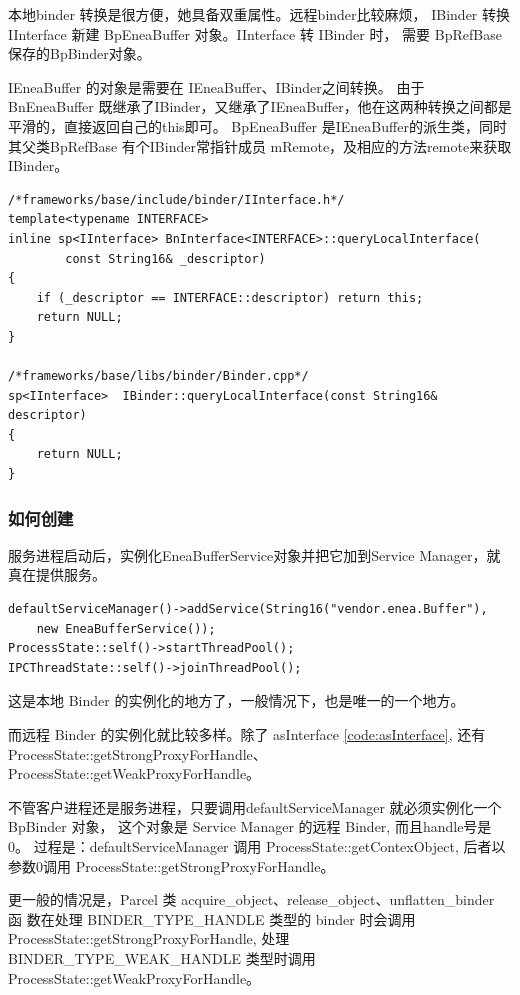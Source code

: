 \documentclass[a4paper,11pt]{article}
\begin{document}
本地binder 转换是很方便，她具备双重属性。远程binder比较麻烦，  IBinder 转换
IInterface 新建 BpEneaBuffer 对象。IInterface 转 IBinder 时， 需要 BpRefBase
保存的BpBinder对象。

IEneaBuffer 的对象是需要在 IEneaBuffer、IBinder之间转换。
由于 BnEneaBuffer 既继承了IBinder，又继承了IEneaBuffer，他在这两种转换之间都是平滑的，直接返回自己的this即可。
 BpEneaBuffer 是IEneaBuffer的派生类，同时其父类BpRefBase 有个IBinder常指针成员 mRemote，及相应的方法remote来获取IBinder。

\begin{lstlisting}[]
/*frameworks/base/include/binder/IInterface.h*/
template<typename INTERFACE>
inline sp<IInterface> BnInterface<INTERFACE>::queryLocalInterface(
        const String16& _descriptor)
{
    if (_descriptor == INTERFACE::descriptor) return this;
    return NULL;
}    

/*frameworks/base/libs/binder/Binder.cpp*/
sp<IInterface>  IBinder::queryLocalInterface(const String16& descriptor)
{
    return NULL;
} 
\end{lstlisting}

\subsubsection{如何创建}
服务进程启动后，实例化EneaBufferService对象并把它加到Service Manager，就真在提供服务。 
\begin{lstlisting}
defaultServiceManager()->addService(String16("vendor.enea.Buffer"),
    new EneaBufferService());
ProcessState::self()->startThreadPool();
IPCThreadState::self()->joinThreadPool();
\end{lstlisting}
这是本地 Binder 的实例化的地方了，一般情况下，也是唯一的一个地方。

而远程 Binder 的实例化就比较多样。除了 asInterface \ref{code:asInterface},
还有 ProcessState::getStrongProxyForHandle、
ProcessState::getWeakProxyForHandle。

不管客户进程还是服务进程，只要调用defaultServiceManager 就必须实例化一个
BpBinder 对象， 这个对象是 Service Manager 的远程 Binder, 而且handle号是0。
过程是：defaultServiceManager 调用 ProcessState::getContexObject, 后者以参数0调用
ProcessState::getStrongProxyForHandle。

更一般的情况是，Parcel 类 acquire_object、release_object、unflatten_binder 函
数在处理 BINDER_TYPE_HANDLE 类型的 binder 时会调用
ProcessState::getStrongProxyForHandle, 处理 BINDER_TYPE_WEAK_HANDLE 类型时调用
ProcessState::getWeakProxyForHandle。
\end{document}
